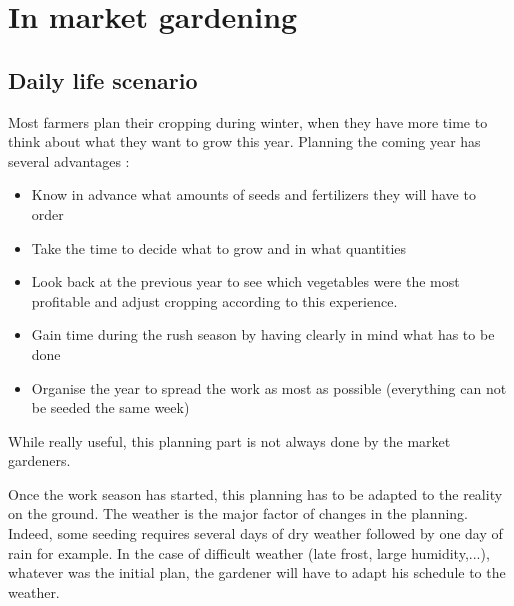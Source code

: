 

\section{In market gardening}


\subsection{Daily life scenario}
Most farmers plan their cropping during winter\cite{planification-methodology}, when they have more time to think about what they want to grow this year. Planning the coming year has several advantages : 

\begin{itemize}
	\item Know in advance what amounts of seeds and fertilizers they will have to order
	\item Take the time to decide what to grow and in what quantities
	\item Look back at the previous year to see which vegetables were the most profitable and adjust cropping according to this experience.
	\item Gain time during the rush season by having clearly in mind what has to be done
	\item Organise the year to spread the work as most as possible (everything can not be seeded the same week)
\end{itemize}

While really useful, this planning part is not always done by the market gardeners. 

Once the work season has started, this planning has to be adapted to the reality on the ground.
The weather is the major factor of changes in the planning. Indeed, some seeding requires several days of dry weather followed by one day of rain for example. In the case of difficult weather (late frost, large humidity,...), whatever was the initial plan, the gardener will have to adapt his schedule to the weather.




